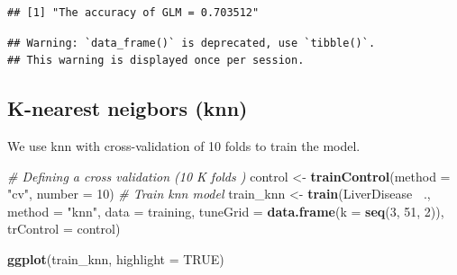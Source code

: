 \documentclass[]{article}
\newenvironment{Shaded}{\begin{snugshade}}{\end{snugshade}}
\newcommand{\CommentTok}[1]{\textcolor[rgb]{0.56,0.35,0.01}{\textit{#1}}}
\newcommand{\DataTypeTok}[1]{\textcolor[rgb]{0.13,0.29,0.53}{#1}}
\newcommand{\DecValTok}[1]{\textcolor[rgb]{0.00,0.00,0.81}{#1}}
\newcommand{\KeywordTok}[1]{\textcolor[rgb]{0.13,0.29,0.53}{\textbf{#1}}}
\newcommand{\NormalTok}[1]{#1}
\newcommand{\OperatorTok}[1]{\textcolor[rgb]{0.81,0.36,0.00}{\textbf{#1}}}
\newcommand{\OtherTok}[1]{\textcolor[rgb]{0.56,0.35,0.01}{#1}}
\newcommand{\StringTok}[1]{\textcolor[rgb]{0.31,0.60,0.02}{#1}}
\begin{document}
\begin{Shaded}
\end{Shaded}

\begin{verbatim}
## [1] "The accuracy of GLM = 0.703512"
\end{verbatim}

\begin{Shaded}
\end{Shaded}

\begin{verbatim}
## Warning: `data_frame()` is deprecated, use `tibble()`.
## This warning is displayed once per session.
\end{verbatim}

\subsection{K-nearest neigbors (knn)}

We use knn with cross-validation of 10 folds to train the model.

\begin{Shaded}
\begin{Highlighting}[]
\CommentTok{# Defining a cross validation (10 K folds )}
\NormalTok{control <-}\StringTok{ }\KeywordTok{trainControl}\NormalTok{(}\DataTypeTok{method =} \StringTok{"cv"}\NormalTok{, }\DataTypeTok{number =} \DecValTok{10}\NormalTok{)}
\CommentTok{# Train knn model}
\NormalTok{train_knn <-}\StringTok{ }\KeywordTok{train}\NormalTok{(LiverDisease}\OperatorTok{~}\StringTok{ }\NormalTok{.,}
                   \DataTypeTok{method =} \StringTok{"knn"}\NormalTok{, }
                   \DataTypeTok{data =}\NormalTok{ training,}
                   \DataTypeTok{tuneGrid =} \KeywordTok{data.frame}\NormalTok{(}\DataTypeTok{k =} \KeywordTok{seq}\NormalTok{(}\DecValTok{3}\NormalTok{, }\DecValTok{51}\NormalTok{, }\DecValTok{2}\NormalTok{)),}
                   \DataTypeTok{trControl =}\NormalTok{ control)}

\KeywordTok{ggplot}\NormalTok{(train_knn, }\DataTypeTok{highlight =} \OtherTok{TRUE}\NormalTok{)}
\end{Highlighting}
\end{Shaded}
\end{document}

